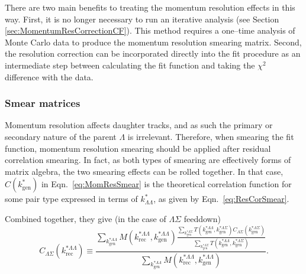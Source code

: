 There are two main benefits to treating the momentum resolution effects in this way. 
First, it is no longer necessary to run an iterative analysis (see Section \ref{sec:MomentumResCorrectionCF}). 
This method requires a one--time analysis of Monte Carlo data to produce the momentum resolution smearing matrix. 
Second, the resolution correction can be incorporated directly into the fit procedure as an intermediate step between calculating the fit function and taking the $\chi^2$ difference with the data.

\subsubsection{Smear matrices}

Momentum resolution affects daughter tracks, and as such the primary or secondary nature of the parent $\Lambda$ is irrelevant.
Therefore, when smearing the fit function, momentum resolution smearing should be applied after residual correlation smearing. 
In fact, as both types of smearing are effectively forms of matrix algebra, the two smearing effects can be rolled together. 
In that case, $C(k^*_\mathrm{gen})$ in Eqn.\ \ref{eq:MomResSmear} is the theoretical correlation function for some pair type expressed in terms of $k^*_{\Lambda\Lambda}$, as given by Eqn.\ \ref{eq:ResCorSmear}.

Combined together, they give (in the case of $\Lambda\Sigma$ feeddown)
\begin{equation}
C_{\Lambda\Sigma}(k^{*\Lambda\Lambda}_{\mathrm{rec}}) \equiv \frac{\displaystyle\sum\limits_{k^{*\Lambda\Lambda}_{\mathrm{gen}}}M(k^{*\Lambda\Lambda}_{\mathrm{rec}},k^{*\Lambda\Lambda}_{\mathrm{gen}})
 \frac{\displaystyle\sum\limits_{k^{*\Lambda\Sigma}_{\mathrm{gen}}}T(k^{*\Lambda\Lambda}_\mathrm{gen},k^{*\Lambda\Sigma}_{\mathrm{gen}})C_{\Lambda\Sigma}(k^{*\Lambda\Sigma}_{\mathrm{gen}})}{\displaystyle\sum\limits_{k^{*\Lambda\Sigma}_{\mathrm{gen}}}T(k^{*\Lambda\Lambda}_\mathrm{gen},k^{*\Lambda\Sigma}_{\mathrm{gen}})}
}{\displaystyle\sum\limits_{k^{*\Lambda\Lambda}_{\mathrm{gen}}}M(k^{*\Lambda\Lambda}_{\mathrm{rec}},k^{*\Lambda\Lambda}_{\mathrm{gen}})}.
\end{equation}

